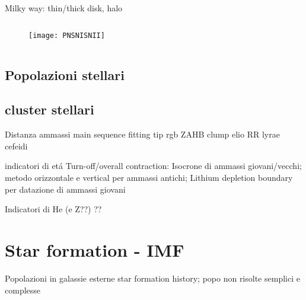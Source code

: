 \begin{frame}{Milky way: thin/thick disk, halo}
\begin{columns}[T]
\begin{column}{0.6\textwidth}
\begin{figure}[!ht]\texttt{[image: PNSNISNII]}\label{fig:PNSNISNII}
\end{figure}
\end{column}
\begin{column}{0.4\textwidth}

\end{column}
\end{columns}
\end{frame}

\subsection{Popolazioni stellari}

\subsection{cluster stellari}

\begin{frame}{Distanza ammassi}
main sequence fitting
tip rgb
ZAHB
clump elio
RR lyrae
cefeidi
\end{frame}

\begin{frame}{indicatori di et\'a}
Turn-off/overall contraction: Isocrone di ammassi giovani/vecchi; metodo orizzontale e vertical per ammassi antichi; Lithium depletion boundary per datazione di ammassi giovani
\end{frame}

\begin{frame}{Indicatori di He (e Z??)}
??
\end{frame}

\section{Star formation - IMF}

\begin{frame}{Popolazioni in galassie esterne}
star formation history; popo non risolte semplici e complesse
\end{frame}